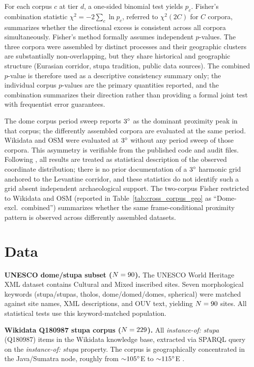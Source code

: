 \documentclass[12pt,a4paper]{article}
\newcommand{\degr}{\ifmmode^\circ\else\textdegree{}\fi}
\begin{document}
For each corpus $c$ at tier $d$, a one-sided binomial test yields
$p_c$. Fisher's combination statistic $\chi^2 = -2\sum_c \ln p_c$,
referred to $\chi^2(2C)$ for $C$ corpora, summarizes whether the
directional excess is consistent across all corpora simultaneously.
Fisher's method formally assumes independent $p$-values. The three
corpora were assembled by distinct processes and their geographic
clusters are substantially non-overlapping, but they share historical
and geographic structure (Eurasian corridor, stupa tradition, public
data sources). The combined $p$-value is therefore used as a descriptive
consistency summary only; the individual corpus $p$-values are the
primary quantities reported, and the combination summarizes their direction rather
than providing a formal joint test with frequentist error guarantees.

The dome corpus period sweep reports $3\degr$ as the dominant proximity
peak in that corpus; the differently assembled corpora are evaluated at
the same period. Wikidata and OSM were evaluated at $3\degr$ without
any period sweep of those corpora. This asymmetry is verifiable from the
published code and audit files. Following \citet{silva2020statistical}, all
results are treated as statistical description of the observed coordinate
distribution; there is no
prior documentation of a $3\degr$ harmonic grid anchored to the Levantine
corridor, and these statistics do not identify such a grid absent
independent archaeological support. The two-corpus Fisher restricted to Wikidata
and OSM (reported in Table~\ref{tab:cross_corpus_geo} as ``Dome-excl.\
combined'') summarizes whether the same frame-conditional proximity pattern
is observed across differently assembled datasets.

\section{Data}
\label{sec:data}

\textbf{UNESCO dome/stupa subset ($N = 90{}$).}
The UNESCO World Heritage XML dataset \citep{unescowhc2024xml} contains
\NclusterTotal{} Cultural and Mixed inscribed sites. Seven morphological
keywords (stupa/stupas, tholos, dome/domed/domes, spherical) were
matched against site names, XML descriptions, and OUV text, yielding
$N = 90{}$ sites. All statistical tests use this
keyword-matched population.

\textbf{Wikidata Q180987 stupa corpus ($N = 229{}$).}
All \textit{instance-of: stupa} (Q180987) items in the Wikidata
knowledge base, extracted via SPARQL query on the
\textit{instance-of: stupa} property. The corpus is
geographically concentrated in the Java/Sumatra node, roughly from
${\sim}105\degr$E to ${\sim}115\degr$E \citep{miksic1990borobudur}.
\end{document}
